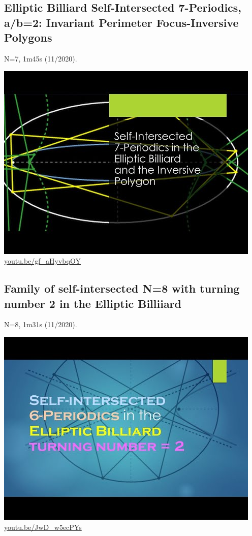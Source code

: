\documentclass[12pt]{amsart}
\begin{document}
\subsection{Elliptic Billiard Self-Intersected 7-Periodics, a/b=2: Invariant Perimeter Focus-Inversive Polygons}
\label{vid:gf_aHyvbqOY}
\noindent N=7, 1m45s (11/2020). 
\begin{center}\includegraphics[width=.5\textwidth]{pics/gf_aHyvbqOY.jpg} \\ 
\href{https://youtu.be/gf_aHyvbqOY}{\url{youtu.be/gf\_aHyvbqOY}}\end{center}
% 

\subsection{Family of self-intersected N=8 with turning number 2 in the Elliptic Billiiard}
\label{vid:JwD_w5ecPYs}
\noindent N=8, 1m31s (11/2020). 
\begin{center}\includegraphics[width=.5\textwidth]{pics/JwD_w5ecPYs.jpg} \\ 
\href{https://youtu.be/JwD_w5ecPYs}{\url{youtu.be/JwD\_w5ecPYs}}\end{center}
% 
\end{document}
